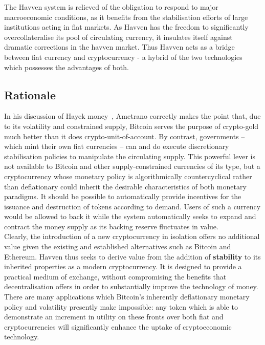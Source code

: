 \noindent The Havven system is relieved of the obligation to respond to major macroeconomic conditions, 
as it benefits from the stabilisation efforts of large institutions acting in fiat markets.
As Havven has the freedom to significantly overcollateralise its pool of circulating currency, it
insulates itself against dramatic corrections in the havven market.
Thus Havven acts as a bridge between fiat currency and cryptocurrency - a hybrid of the two technologies which possesses
the advantages of both.

\subsection{Rationale}

\noindent  In his discussion of Hayek money~\cite{ametrano2016hayek}, Ametrano correctly makes the point that,
due to its volatility and constrained supply, Bitcoin serves the purpose of crypto-gold much better than it
does crypto-unit-of-account. By contrast, governments -- which mint their own fiat currencies -- can and do execute
discretionary stabilisation policies to manipulate the circulating supply. This powerful lever is not
available to Bitcoin and other supply-constrained currencies of its type, but a cryptocurrency whose monetary
policy is algorithmically countercyclical rather than deflationary could inherit the desirable characteristics
of both monetary paradigms. It should be possible to automatically provide incentives for the issuance and
destruction of tokens according to demand. Users of such a currency would be allowed to back it while
the system automatically seeks to expand and contract the money supply as its backing
reserve fluctuates in value. \\

\noindent Clearly, the introduction of a new cryptocurrency in isolation offers no additional value given
the existing and established alternatives such as Bitcoin and Ethereum. Havven thus seeks to derive value
from the addition of \textbf{stability} to its inherited properties as a modern cryptocurrency.
It is designed to provide a practical medium of exchange, without compromising the benefits that
decentralisation offers in order to substantially improve the technology of money.
There are many applications which Bitcoin's inherently deflationary monetary policy and
volatility presently make impossible: any token which is able to demonstrate an increment
in utility on these fronts over both fiat and cryptocurrencies will significantly
enhance the uptake of cryptoeconomic technology.


\pagebreak
